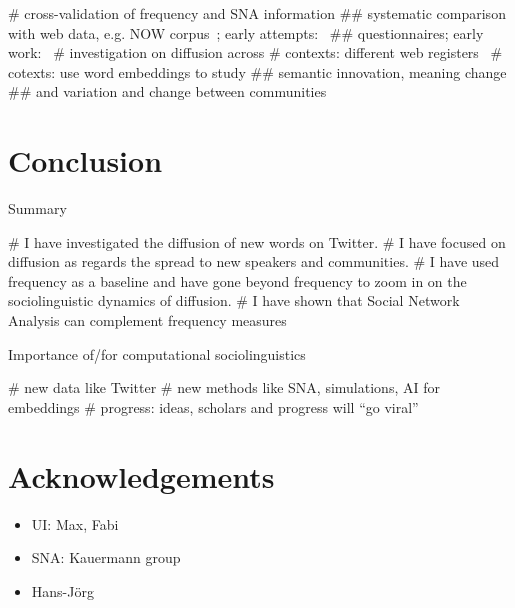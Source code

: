 \documentclass[
  a4paper,
  abstract=on,
  captions=tableabove
  ]{scrartcl}
\begin{document}

    \begin{qitem}
      # cross-validation of frequency and SNA information
        ## systematic comparison with web data, e.g. NOW corpus~\parencite{Davies2013CorpusNews}; early attempts:~\cite{Wurschinger2016UsingWeb}
        ## questionnaires; early work:~\cite{Kerremans2015WebNew}
      # investigation on diffusion across
        # contexts: different web registers~\parencite{Biber2016RegisterVariation}
        # cotexts: use word embeddings to study
          ## semantic innovation, meaning change
          ## and variation and change between communities~\parencite{Tredici2019YouShall} 
    \end{qitem}

\section{Conclusion}
  \label{sec:conclusion}

  Summary

    \begin{qitem}
      # I have investigated the diffusion of new words on Twitter.
      # I have focused on diffusion as regards the spread to new speakers and communities.
      # I have used frequency as a baseline and have gone beyond frequency to zoom in on the sociolinguistic dynamics of diffusion.
      # I have shown that Social Network Analysis can complement frequency measures
    \end{qitem}

  Importance of/for computational sociolinguistics

    \begin{qitem}
      # new data like Twitter
      # new methods like SNA, simulations, AI for embeddings
      # progress: ideas, scholars and progress will ``go viral''
    \end{qitem}


\printbibliography

\section*{Acknowledgements}

\begin{itemize}
  \item UI: Max, Fabi
  \item SNA: Kauermann group
  \item Hans-Jörg
\end{itemize}
\end{document}
